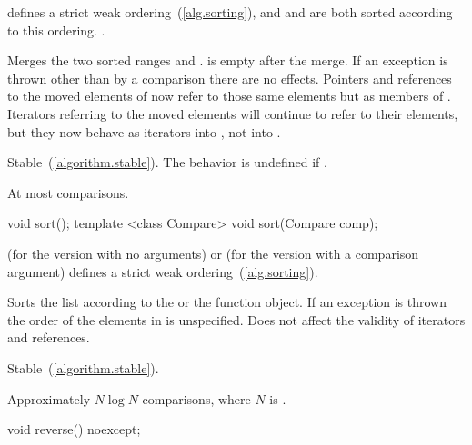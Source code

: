 \begin{itemdescr}
\pnum
\requires {} defines a strict weak ordering~(\ref{alg.sorting}), and 
and  are both sorted according to this ordering.
.

\pnum
\effects Merges the two sorted ranges \tcode{[begin(), end())} and
\tcode{[x.begin(), x.end())}.  is empty after the merge. If an
exception is thrown other than by a comparison there are no effects.
Pointers and references to the moved elements of  now refer to those same elements
but as members of . Iterators referring to the moved elements will continue to
refer to their elements, but they now behave as iterators into , not into
.

\pnum
\remarks Stable~(\ref{algorithm.stable}). The behavior is undefined if
.

\pnum
\complexity At most  comparisons.
\end{itemdescr}

%
%
\begin{itemdecl}
void sort();
template <class Compare> void sort(Compare comp);
\end{itemdecl}

\begin{itemdescr}
\pnum
\requires {} (for the version with no arguments) or  (for the
version with a comparison argument) defines a strict weak ordering~(\ref{alg.sorting}).

\pnum
\effects Sorts the list according to the  or the  function object.
If an exception is thrown the order of the elements in  is unspecified.
Does not affect the validity of iterators and references.

\pnum
\remarks Stable~(\ref{algorithm.stable}).

\pnum
\complexity Approximately $N \log N$ comparisons, where $N$ is .
\end{itemdescr}

%
%
\begin{itemdecl}
void reverse() noexcept;
\end{itemdecl}

